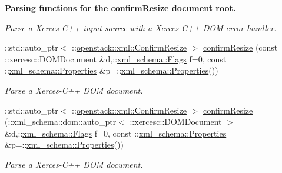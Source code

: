 \begin{Indent}{\bf Parsing functions for the confirmResize document root.}
\begin{DoxyCompactItemize}
\begin{DoxyCompactList}\small\item\em Parse a Xerces-\/C++ input source with a Xerces-\/C++ DOM error handler. \item\end{DoxyCompactList}\item 
::std::auto\_\-ptr$<$ ::\hyperlink{classopenstack_1_1xml_1_1ConfirmResize}{openstack::xml::ConfirmResize} $>$ \hyperlink{namespaceopenstack_1_1xml_ad65a29d0cb8588729bc007f6a086ff9b}{confirmResize} (const ::xercesc::DOMDocument \&d,::\hyperlink{namespacexml__schema_affb4c227cbd9aa7453dd1dc5a1401943}{xml\_\-schema::Flags} f=0, const ::\hyperlink{namespacexml__schema_ad27ce19a7ee1d3b1064092648898f64c}{xml\_\-schema::Properties} \&p=::\hyperlink{namespacexml__schema_ad27ce19a7ee1d3b1064092648898f64c}{xml\_\-schema::Properties}())
\begin{DoxyCompactList}\small\item\em Parse a Xerces-\/C++ DOM document. \item\end{DoxyCompactList}\item 
::std::auto\_\-ptr$<$ ::\hyperlink{classopenstack_1_1xml_1_1ConfirmResize}{openstack::xml::ConfirmResize} $>$ \hyperlink{namespaceopenstack_1_1xml_aea85d54f29bc3df64e8cd1cbcd59403d}{confirmResize} (::xml\_\-schema::dom::auto\_\-ptr$<$ ::xercesc::DOMDocument $>$ \&d,::\hyperlink{namespacexml__schema_affb4c227cbd9aa7453dd1dc5a1401943}{xml\_\-schema::Flags} f=0, const ::\hyperlink{namespacexml__schema_ad27ce19a7ee1d3b1064092648898f64c}{xml\_\-schema::Properties} \&p=::\hyperlink{namespacexml__schema_ad27ce19a7ee1d3b1064092648898f64c}{xml\_\-schema::Properties}())
\begin{DoxyCompactList}\small\item\em Parse a Xerces-\/C++ DOM document. \item\end{DoxyCompactList}\end{DoxyCompactItemize}
\end{Indent}
